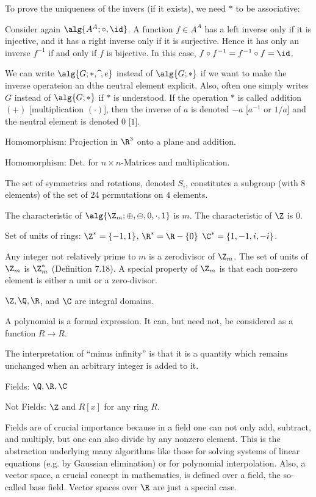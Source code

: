 \Com To prove the uniqueness of the invers (if it exists), we need $*$ to be
associative:

\Ex Consider again $\alg{A^{A};\circ,\id}$. A function $f\in A^{A}$ has a left
inverse only if it is injective, and it has a right inverse only if it is
surjective. Hence it has only an inverse $f^{-1}$ if and only if $f$ is
bijective. In this case, $f\circ f^{-1} = f^{-1}\circ f = \id$.

\Com We can write $\alg{G;*,\widehat{\ },e}$ instead of $\alg{G;*}$ if we want
to make the inverse operateion an dthe neutral element explicit. Also, often one
simply writes $G$ instead of $\alg{G;*}$ if $*$ is understood. If the operation
$*$ is called addition $(+)$ [multiplication $(\cdot)$], then the inverse of $a$
is denoted $-a$ [$a^{-1}$ or $1/a$] and the neutral element is denoted $0$
[$1$].

\Ex Homomorphism: Projection in $\R^3$ onto a plane and addition.

\Ex Homomorphism: Det. for $n\times n$-Matrices and multiplication.

\Ex The set of symmetries and rotations, denoted $S_\square$, constitutes a
subgroup (with 8 elements) of the set of 24 permutations on $4$ elements.

\Ex The characteristic of $\alg{\Z_m;\oplus,\ominus,0,\cdot,1}$ is $m$. The
characteristic of $\Z$ is 0.

\Ex Set of units of rings: $\Z^*=\{-1,1\}$, $\R^*=\R-\{0\}$ $\C^*=\{1,-1,i,-i\}$.

\Ex Any integer not relatively prime to $m$ is a zerodivisor of $\Z_m$. The set
of units of $\Z_m$ is $\Z^*_m$ (Definition 7.18). A special property of $\Z_m$
is that each non-zero element is either a unit or a zero-divisor.

\Ex $\Z,\Q,\R$, and $\C$ are integral domains.

\Com A polynomial is a formal expression. It can, but need not, be considered as
a function $R\to R$.

\Com The interpretation of ``minus infinity'' is that it is a quantity which
remains unchanged when an arbitrary integer is added to it.

\Ex Fields: $\Q,\R,\C$

\Ex Not Fields: $\Z$ and $R[x]$ for any ring $R$.

\Com Fields are of crucial importance because in a field one can not only add,
subtract, and multiply, but one can also divide by any nonzero element. This is
the abstraction underlying many algorithms like those for solving systems of
linear equations (e.g. by Gaussian elimination) or for polynomial interpolation.
Also, a vector space, a crucial concept in mathematics, is defined over a field,
the so-called base field. Vector spaces over $\R$ are just a special case.


